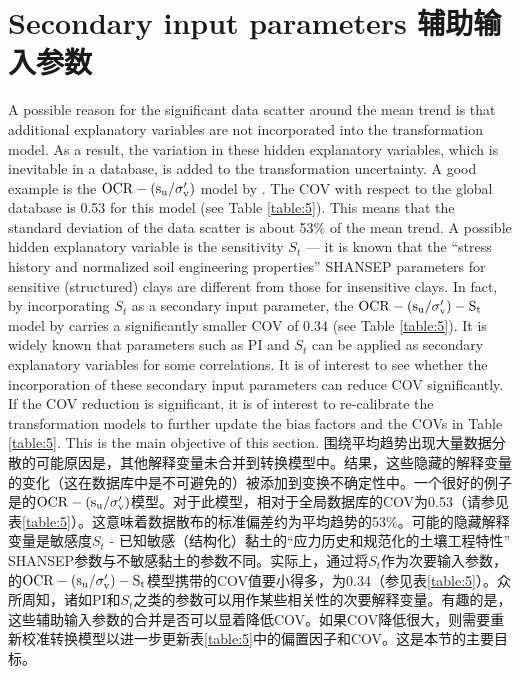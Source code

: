 \section{Secondary input parameters 辅助输入参数}

\begin{Parallel}{0.60\textwidth}{}
    \ParallelLText
    {
        A possible reason for the significant data scatter around the mean trend is that additional explanatory variables are not incorporated into the transformation model. As a result, the variation in these hidden explanatory variables, which is inevitable in a database, is added to the transformation uncertainty. A good example is the $\rm{OCR}-(s_u/\sigma_v')$ model by \citet{Jamiolkowski198557}. The COV with respect to the global database is 0.53 for this model (see Table \ref{table:5}). This means that the standard deviation of the data scatter is about 53$\%$ of the mean trend. A possible hidden explanatory variable is the sensitivity $S_t$ — it is known that the “stress history and normalized soil engineering properties” SHANSEP parameters for sensitive (structured) clays are different from those for insensitive clays. In fact, by incorporating $S_t$ as a secondary input parameter, the $\rm{OCR}-(s_u/\sigma_v')-S_t$ model by \cite{Ching2012522}carries a significantly smaller COV of 0.34 (see Table \ref{table:5}). It is widely known that parameters such as PI and $S_t$ can be applied as secondary explanatory variables for some correlations. It is of interest to see whether the incorporation of these secondary input parameters can reduce COV significantly. If the COV reduction is significant, it is of interest to re-calibrate the transformation models to further update the bias factors and the COVs in Table \ref{table:5}. This is the main objective of this section.
    }
    \ParallelRText
    {
        围绕平均趋势出现大量数据分散的可能原因是，其他解释变量未合并到转换模型中。结果，这些隐藏的解释变量的变化（这在数据库中是不可避免的）被添加到变换不确定性中。一个很好的例子是\citet{Jamiolkowski198557}的$\rm{OCR}-(s_u/\sigma_v')$模型。对于此模型，相对于全局数据库的COV为0.53（请参见表\ref{table:5}）。这意味着数据散布的标准偏差约为平均趋势的53$\%$。可能的隐藏解释变量是敏感度$S_t$ - 已知敏感（结构化）黏土的“应力历史和规范化的土壤工程特性” SHANSEP参数与不敏感黏土的参数不同。实际上，通过将$S_t$作为次要输入参数，\cite{Ching2012522}的$\rm{OCR}-(s_u/\sigma_v')-S_t$模型携带的COV值要小得多，为0.34（参见表\ref{table:5}）。众所周知，诸如PI和$S_t$之类的参数可以用作某些相关性的次要解释变量。有趣的是，这些辅助输入参数的合并是否可以显着降低COV。如果COV降低很大，则需要重新校准转换模型以进一步更新表\ref{table:5}中的偏置因子和COV。这是本节的主要目标。
    }
\end{Parallel}


